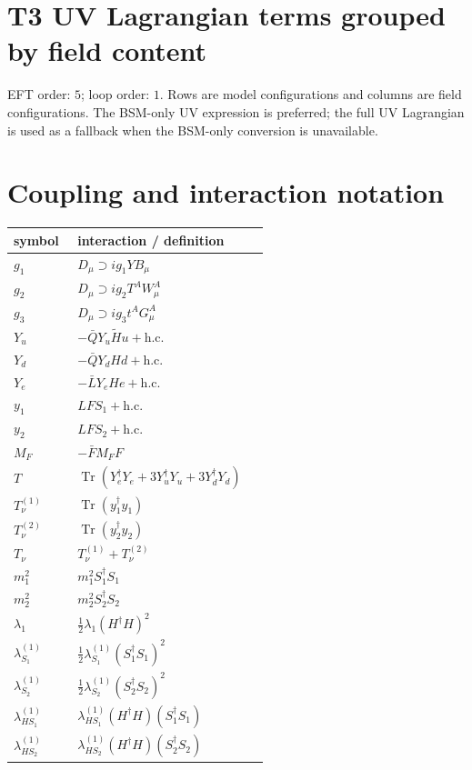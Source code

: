 \documentclass[8pt]{article}
\begin{document}
\begin{landscape}
\section*{T3 UV Lagrangian terms grouped by field content}
EFT order: $5$; loop order: $1$. 
Rows are model configurations and columns are field configurations. The BSM-only UV expression is preferred; the full UV Lagrangian is used as a fallback when the BSM-only conversion is unavailable.
\section*{Coupling and interaction notation}
\begin{longtable}{@{}p{0.23\linewidth}p{0.69\linewidth}@{}}
\toprule
symbol & interaction / definition \\
\midrule
$g_1$ & $D_\mu\supset i g_1YB_\mu$ \\
$g_2$ & $D_\mu\supset i g_2T^AW_\mu^A$ \\
$g_3$ & $D_\mu\supset i g_3t^AG_\mu^A$ \\
$Y_u$ & $-\bar QY_u\widetilde Hu+\mathrm{h.c.}$ \\
$Y_d$ & $-\bar QY_dHd+\mathrm{h.c.}$ \\
$Y_e$ & $-\bar LY_eHe+\mathrm{h.c.}$ \\
$y_1$ & $LFS_1+\mathrm{h.c.}$ \\
$y_2$ & $LFS_2+\mathrm{h.c.}$ \\
$M_F$ & $-\bar FM_FF$ \\
$T$ & $\operatorname{Tr}(Y_e^\dagger Y_e+3Y_u^\dagger Y_u+3Y_d^\dagger Y_d)$ \\
$T_\nu^{(1)}$ & $\operatorname{Tr}(y_1^\dagger y_1)$ \\
$T_\nu^{(2)}$ & $\operatorname{Tr}(y_2^\dagger y_2)$ \\
$T_\nu$ & $T_\nu^{(1)}+T_\nu^{(2)}$ \\
$m_1^2$ & $m_1^2S_1^\dagger S_1$ \\
$m_2^2$ & $m_2^2S_2^\dagger S_2$ \\
$\lambda_1$ & $\frac12\lambda_1(H^\dagger H)^2$ \\
$\lambda_{S_1}^{(1)}$ & $\frac12\lambda_{S_1}^{(1)}(S_1^\dagger S_1)^2$ \\
$\lambda_{S_2}^{(1)}$ & $\frac12\lambda_{S_2}^{(1)}(S_2^\dagger S_2)^2$ \\
$\lambda_{HS_1}^{(1)}$ & $\lambda_{HS_1}^{(1)}(H^\dagger H)(S_1^\dagger S_1)$ \\
$\lambda_{HS_2}^{(1)}$ & $\lambda_{HS_2}^{(1)}(H^\dagger H)(S_2^\dagger S_2)$ \\

\end{longtable}
\end{landscape}
\end{document}
